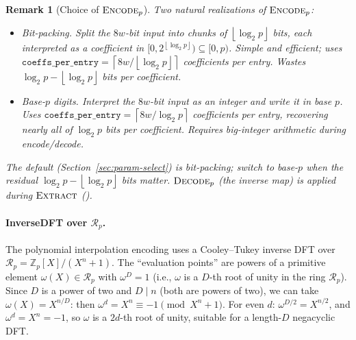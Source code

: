 \documentclass[11pt,a4paper]{article}
\newcommand{\Z}{\mathbb{Z}}
\newcommand{\R}{\mathcal{R}}
\newcommand{\Rp}{\R_{p}}
\newcommand{\floor}[1]{\left\lfloor #1 \right\rfloor}
\newcommand{\ceil}[1]{\left\lceil #1 \right\rceil}
\newtheorem{remark}{Remark}
\begin{document}
\begin{remark}[Choice of $\textsc{Encode}_p$]
Two natural realizations of $\textsc{Encode}_p$:
\begin{itemize}[nosep]
    \item \emph{Bit-packing.} Split the $8w$-bit input into chunks of $\floor{\log_2 p}$ bits, each interpreted as a coefficient in $[0, 2^{\floor{\log_2 p}}) \subseteq [0, p)$. Simple and efficient; uses $\texttt{coeffs\_per\_entry} = \ceil{8w / \floor{\log_2 p}}$ coefficients per entry. Wastes $\log_2 p - \floor{\log_2 p}$ bits per coefficient.
    \item \emph{Base-$p$ digits.} Interpret the $8w$-bit input as an integer and write it in base $p$. Uses $\texttt{coeffs\_per\_entry} = \ceil{8w / \log_2 p}$ coefficients per entry, recovering nearly all of $\log_2 p$ bits per coefficient. Requires big-integer arithmetic during encode/decode.
\end{itemize}
The default (Section~\ref{sec:param-select}) is bit-packing; switch to base-$p$ when the residual $\log_2 p - \floor{\log_2 p}$ bits matter.
$\textsc{Decode}_p$ (the inverse map) is applied during $\textsc{Extract}$ ().
\end{remark}

\paragraph{InverseDFT over $\Rp$.}\label{par:inversedft}
The polynomial interpolation encoding uses a Cooley--Tukey inverse DFT over $\Rp = \Z_p[X]/(X^n+1)$.
The ``evaluation points'' are powers of a primitive element $\omega(X) \in \Rp$ with $\omega^D = 1$ (i.e., $\omega$ is a $D$-th root of unity in the ring $\Rp$).
Since $D$ is a power of two and $D \mid n$ (both are powers of two), we can take $\omega(X) = X^{n/D}$: then $\omega^d = X^n \equiv -1 \pmod{X^n+1}$.
For even $d$: $\omega^{D/2} = X^{n/2}$, and $\omega^d = X^n = -1$, so $\omega$ is a $2d$-th root of unity, suitable for a length-$D$ negacyclic DFT.
\end{document}
